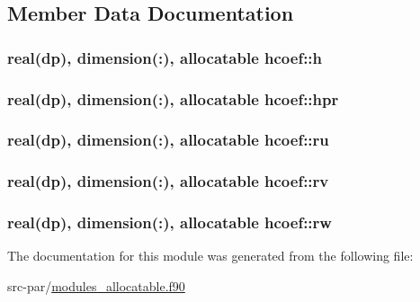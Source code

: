 \subsection{Member Data Documentation}
\hypertarget{classhcoef_a0fe90253d788ab22a12015d18132d8bf}{
\subsubsection[{h}]{\setlength{\rightskip}{0pt plus 5cm}real(dp), dimension(\-:), allocatable hcoef\-::h}}\label{classhcoef_a0fe90253d788ab22a12015d18132d8bf}
\hypertarget{classhcoef_aac65983f64ce20a3ddb35933d35cb78b}{
\subsubsection[{hpr}]{\setlength{\rightskip}{0pt plus 5cm}real(dp), dimension(\-:), allocatable hcoef\-::hpr}}\label{classhcoef_aac65983f64ce20a3ddb35933d35cb78b}
\hypertarget{classhcoef_abff8e220ad240114fdb4775dcf026ca1}{
\subsubsection[{ru}]{\setlength{\rightskip}{0pt plus 5cm}real(dp), dimension(\-:), allocatable hcoef\-::ru}}\label{classhcoef_abff8e220ad240114fdb4775dcf026ca1}
\hypertarget{classhcoef_a817f137e681d7382d4ac542179b85cb2}{
\subsubsection[{rv}]{\setlength{\rightskip}{0pt plus 5cm}real(dp), dimension(\-:), allocatable hcoef\-::rv}}\label{classhcoef_a817f137e681d7382d4ac542179b85cb2}
\hypertarget{classhcoef_a10cd6a89a20929137ddb8a7a9d29ba2d}{
\subsubsection[{rw}]{\setlength{\rightskip}{0pt plus 5cm}real(dp), dimension(\-:), allocatable hcoef\-::rw}}\label{classhcoef_a10cd6a89a20929137ddb8a7a9d29ba2d}


The documentation for this module was generated from the following file\-:\begin{DoxyCompactItemize}
\item 
src-\/par/\hyperlink{modules__allocatable_8f90}{modules\-\_\-allocatable.\-f90}\end{DoxyCompactItemize}
